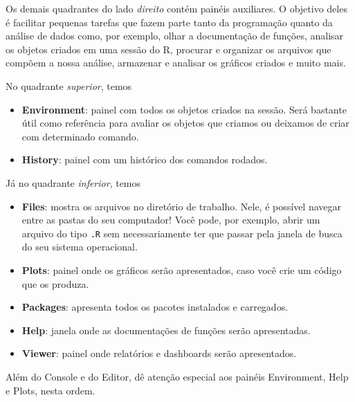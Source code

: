 \documentclass[
  letterpaper,
  DIV=11,
  numbers=noendperiod]{scrreprt}
\begin{document}
Os demais quadrantes do lado \emph{direito} contém painéis auxiliares. O
objetivo deles é facilitar pequenas tarefas que fazem parte tanto da
programação quanto da análise de dados como, por exemplo, olhar a
documentação de funções, analisar os objetos criados em uma sessão do R,
procurar e organizar os arquivos que compõem a nossa análise, armazenar
e analisar os gráficos criados e muito mais.

No quadrante \emph{superior}, temos

\begin{itemize}
\item
  \textbf{Environment}: painel com todos os objetos criados na sessão.
  Será bastante útil como referência para avaliar os objetos que criamos
  ou deixamos de criar com determinado comando.
\item
  \textbf{History}: painel com um histórico dos comandos rodados.
\end{itemize}

Já no quadrante \emph{inferior}, temos

\begin{itemize}
\item
  \textbf{Files}: mostra os arquivos no diretório de trabalho. Nele, é
  possível navegar entre as pastas do seu computador! Você pode, por
  exemplo, abrir um arquivo do tipo \texttt{.R} sem necessariamente ter
  que passar pela janela de busca do seu sistema operacional.
\item
  \textbf{Plots}: painel onde os gráficos serão apresentados, caso você
  crie um código que os produza.
\item
  \textbf{Packages}: apresenta todos os pacotes instalados e carregados.
\item
  \textbf{Help}: janela onde as documentações de funções serão
  apresentadas.
\item
  \textbf{Viewer}: painel onde relatórios e dashboards serão
  apresentados.
\end{itemize}

Além do Console e do Editor, dê atenção especial aos painéis
Environment, Help e Plots, nesta ordem.
\end{document}
